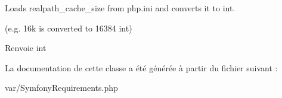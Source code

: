 Loads realpath\+\_\+cache\+\_\+size from php.\+ini and converts it to int.

(e.\+g. 16k is converted to 16384 int)

\begin{DoxyReturn}{Renvoie}
int 
\end{DoxyReturn}


La documentation de cette classe a été générée à partir du fichier suivant \+:\begin{DoxyCompactItemize}
\item 
var/Symfony\+Requirements.\+php\end{DoxyCompactItemize}
